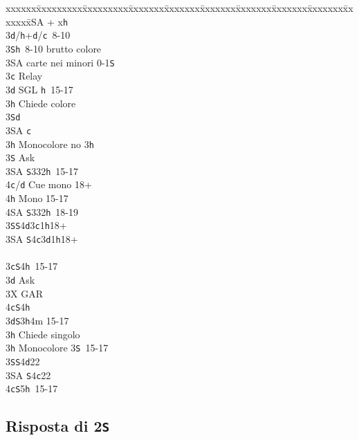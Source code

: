\documentclass[a4paper,italian]{article}
\newcommand{\BS}{\small{\texttt{S}}}
\newcommand{\BC}{\small{\texttt{c}}}
\newcommand{\BD}{\small{\texttt{d}}}
\newcommand{\BH}{\small{\texttt{h}}}
\newcommand{\pdfs}{\texorpdfstring{\texttt{S}}{S}}
\newenvironment{bidtable}
{\begin{tabbing}

    xxxxxx\=xxxxxxxxx\=xxxxxxxxx\=xxxxxxx\=xxxxxxx\=xxxxxxx\=xxxxxxx\=xxxxxxx\=xxxxxxx\=xxxxxxx\=\kill}
{\end{tabbing} }%
\begin{document}
\begin{multicols}{2}
\begin{bidtable}
        2\small{SA} + x\BH \+\\
        3\BD/\BH {}+\BD /\BC\ 8-10\\
        3\BS {}\BH\ 8-10 brutto colore\\
        3\small{SA}  carte nei minori 0-1\BS \\
        3\BC \> Relay\+\\
        3\BD \> SGL \BH\ 15-17\+\\
        3\BH \> Chiede colore\+\\
        3\BS {}\BD \\
        3\small{SA} \BC \-\-\\
        3\BH \> Monocolore no 3\BH \+\\
        3\BS \> Ask\+\\
        3\small{SA} \BS 332\BH\ 15-17\\
        4\BC/\BD \> Cue mono 18+\\
        4\BH \> Mono 15-17\\
        4\small{SA} \BS 332\BH\ 18-19\-\-\\
        3\BS {}\BS4\BD3\BC1\BH 18+\\
        3\small{SA} \BS4\BC3\BD1\BH 18+\-\-\\
        \\
        3\BC {}\BS 4\BH\ 15-17\+\\
        3\BD \> Ask\+\\
        3X \> GAR\\
        4\BC {}\BS 4\BH \-\-\\
        3\BD {}\BS 3\BH 4m 15-17\+\\
        3\BH \> Chiede singolo\-\\
        3\BH \> Monocolore 3\BS\ 15-17\\
        3\BS {}\BS 4\BD 22\\
        3\small{SA} \BS 4\BC 22\\
        4\BC {}\BS 5\BH\ 15-17\\
    \end{bidtable}

    \subsection{Risposta di 2\pdfs}


\end{multicols}
\end{document}
